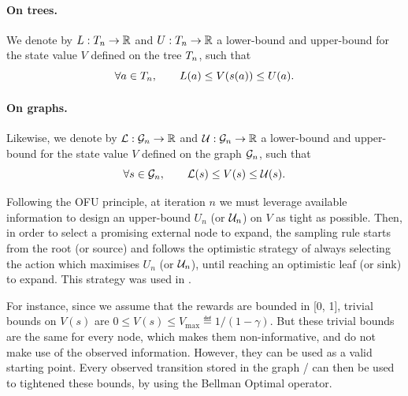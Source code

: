 \documentclass[runningheads]{llncs}
\begin{document}
\begin{definition}
\paragraph{\textbf{On trees.}} We denote by $L:T_n \rightarrow \mathbb{R}$ and  $U:T_n \rightarrow \mathbb{R}$ a lower-bound and upper-bound for the state value $V$ defined on the tree $T_n$, such that
\begin{equation*}
    \forall a\in T_n, \qquad L(a) \leq V(s(a)) \leq U(a).
\end{equation*}

\paragraph{\textbf{On graphs.}} Likewise, we denote by $\mathcal{L}:\mathcal{G}_n \rightarrow \mathbb{R}$ and  $\mathcal{U}:\mathcal{G}_n \rightarrow \mathbb{R}$ a lower-bound and upper-bound for the state value $V$ defined on the graph $\mathcal{G}_n$, such that
\begin{equation*}
\forall s\in\mathcal{G}_n, \qquad \mathcal{L}(s) \leq V(s) \leq \mathcal{U}(s).
\end{equation*}
\end{definition}

Following the OFU principle, at iteration $n$ we must leverage available information to design an upper-bound $U_n$ (or $\mathcal{U}_n$) on $V$ as tight as possible. Then, in order to select a promising external node to expand, the sampling rule starts from the root (or source) and follows the optimistic strategy of always selecting the action which maximises $U_n$ (or $\mathcal{U}_n$), until reaching an optimistic leaf (or sink) to expand. This strategy was used in \citep[e.g.][]{Kocsis06UCT, Hren2008optimistic, Bubeck2010open, Busoniu2012optimistic}.

For instance, since we assume that the rewards are bounded in [0, 1], trivial bounds on $V(s)$ are
$0 \leq V(s) \leq V_{\max} \eqdef {1}/({1-\gamma})$. But these trivial bounds are the same for every node, which makes them non-informative, and do not make use of the observed information. However, they can be used as a valid starting point. Every observed transition stored in the graph / can then be used to tightened these bounds, by using the Bellman Optimal operator.
\end{document}
